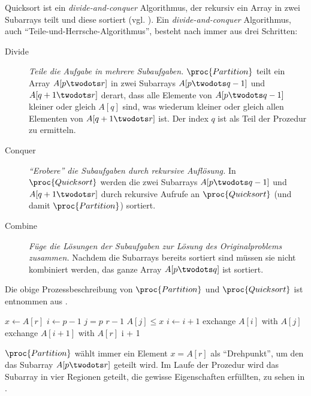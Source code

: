 Quicksort ist ein \emph{divide-and-conquer} Algorithmus, der rekursiv ein Array in zwei Subarrays teilt und diese sortiert (vgl. \cite[113f]{taocp3}). Ein \emph{divide-and-conquer} Algorithmus, auch \enquote{Teile-und-Herrsche-Algorithmus}, besteht nach \cite[65]{clrs2001} immer aus drei Schritten:
\begin{description}
    \item[Divide] \emph{Teile die Aufgabe in mehrere Subaufgaben.} $\proc{Partition}$ teilt ein Array $A[p \twodots r]$ in zwei Subarrays $A[p \twodots q-1]$ und $A[q + 1 \twodots r]$  derart, dass alle Elemente von $A[p \twodots q-1]$ kleiner oder gleich $A[q]$ sind, was wiederum kleiner oder gleich allen Elementen von $A[q + 1 \twodots r]$ ist. Der index $q$ ist als Teil der Prozedur zu ermitteln.

    \item[Conquer] \emph{\enquote{Erobere} die Subaufgaben durch rekursive Auflösung.} In $\proc{Quicksort}$ werden die zwei Subarrays $A[p \twodots q-1]$ und $A[q + 1 \twodots r]$ durch rekursive Aufrufe an $\proc{Quicksort}$ (und damit $\proc{Partition}$) sortiert.

    \item[Combine] \emph{Füge die Lösungen der Subaufgaben zur Lösung des Originalproblems zusammen.} Nachdem die Subarrays bereits sortiert sind müssen sie nicht kombiniert werden, das ganze Array $A[p \twodots q]$ ist sortiert.
\end{description}

Die obige Prozessbeschreibung von $\proc{Partition}$ und $\proc{Quicksort}$ ist entnommen aus \cite[170]{clrs2001}.

\begin{codebox}
    \li $x \gets A[r]$
    \li $i \gets p - 1$
    \li \For $j = p$ \To $r - 1$
    \li     \Do
                \If $A[j] \leq x$
    \li             \Then
                        $i \gets i + 1$
    \li                 exchange $A[i]$ with $A[j]$
                    \End
            \End
    \li exchange $A[i + 1]$ with $A[r]$
    \li \Return i + 1
\end{codebox}

$\proc{Partition}$ wählt immer ein Element $x = A[r]$ als \enquote{Drehpunkt}, um den das Subarray $A[p \twodots r]$ geteilt wird. Im Laufe der Prozedur wird das Subarray in vier Regionen geteilt, die gewisse Eigenschaften erfüllten, zu sehen in .



